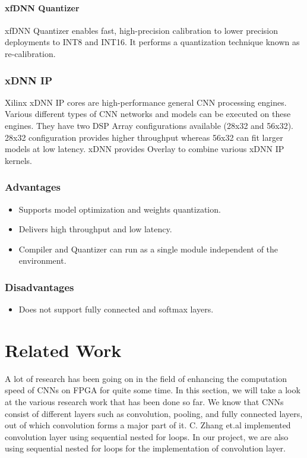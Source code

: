 \documentclass[titlepage]{report}
\begin{document}
\subsubsection{xfDNN Quantizer} 

xfDNN Quantizer enables fast, high-precision calibration to lower precision deployments to INT8 and INT16. It performs a quantization technique known as re-calibration.

\subsection{xDNN IP}
Xilinx xDNN IP cores are high-performance general CNN processing engines. Various different types of CNN networks and models can be executed on these engines. They have two DSP Array configurations available (28x32 and 56x32). 28x32 configuration provides higher throughput whereas 56x32 can fit larger models at low latency.
xDNN provides Overlay to combine various xDNN IP kernels.

\subsection{Advantages}
  
 \begin{itemize}
 \item Supports model optimization and weights quantization.
 \item Delivers high throughput and low latency.
 \item Compiler and Quantizer can run as a single module independent of the environment.

 \end{itemize}
 
\subsection{Disadvantages}
 \begin{itemize}
 \item Does not support fully connected and softmax layers.
 
 \end{itemize}


\chapter{Related Work}
A lot of research has been going on in the field of enhancing the computation speed of CNNs on FPGA for quite some time. In this section, we will take a look at the various research work that has been done so far. We know that CNNs consist of different layers such as convolution, pooling, and fully connected layers, out of which convolution forms a major part of it. C. Zhang et.al implemented convolution layer using sequential nested for loops. In our project, we are also using sequential nested for loops for the implementation of convolution layer.
\end{document}
